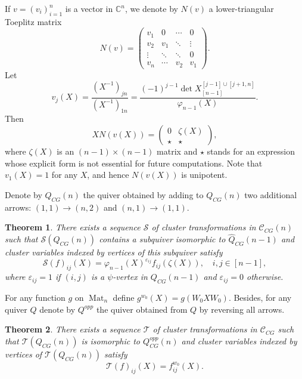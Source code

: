 \documentclass{amsart}
\newtheorem{theorem}{Theorem}
\theoremstyle{definition}
\theoremstyle{remark}
\numberwithin{equation}{section}
\numberwithin{theorem}{section}
\begin{document}
If $v=(v_i)_{i=1}^n$ is a vector in $\mathbb{C}^n$, we denote by $N(v)$ a
lower-triangular Toeplitz matrix
 $$
 N(v) = \left (
 \begin{matrix}
 v_1 & 0 & \cdots & 0\\
 v_2 & v_1 & \ddots  & \vdots\\
 \vdots & \ddots & \ddots  & 0\\
 v_n  & \cdots & v_2 & v_1
 \end{matrix}
 \right ).
 $$
Let 
\begin{equation}
\label{v_j}
v_j(X) = \frac{\left ( X^{-1}\right)_{jn}}{\left ( X^{-1}\right)_{1n}}
=\frac{(-1)^{j-1}\det X_{[n-1]}^{[j-1]\cup[j+1,n]}}{{{\varphi}}_{n-1}(X)}.
\end{equation}
Then
\begin{equation}
\label{zeta}
 X N(v(X)) = \left (
 \begin{array}{cc}
 0 & \zeta(X)\\
 \star & \star
 \end{array}
 \right ),
\end{equation}
 where $\zeta(X)$ is an $(n-1)\times (n-1)$ matrix and $\star$ stands for an expression whose explicit form is not essential for future
computations. Note that $v_1(X)=1$ for any $X$, and hence
$N(v(X))$ is unipotent. 

Denote by $\hat Q_{CG}(n)$ the quiver obtained by adding to $Q_{CG}(n)$ two
additional arrows: $(1,1) \to (n,2)$ and $(n,1)\to (1,1)$.

 \begin{theorem}
 \label{transform1}
  There exists a sequence $\mathcal S$ of cluster transformations in ${{\mathcal C}}_{CG}(n)$
such that $\mathcal S(Q_{CG}(n))$ contains
  a subquiver isomorphic to $\hat Q_{CG}(n-1)$ and cluster variables indexed by
vertices of this subquiver satisfy
  $$\mathcal S(f)_{ij}(X)=
  {{\varphi}}_{n-1}(X)^{\varepsilon_{ij}}
  f_{ij}(\zeta(X)),\quad i,j\in [n-1],
  $$
  where $\varepsilon_{ij}=1$ if $(i,j)$ is a ${{\psi}}$-vertex in $Q_{CG}(n-1)$
and $\varepsilon_{ij}=0$ otherwise.
 \end{theorem}
 
For any function $g$ on ${\operatorname{Mat}}_n$ define $g^{w_0}(X)=g(W_0XW_0)$.
 Besides, for any quiver $Q$ denote by $Q^{opp}$ the quiver obtained from $Q$ by reversing all
arrows. 

  \begin{theorem}
 \label{transform2}
 There exists a sequence $\mathcal T$ of cluster transformations in ${{\mathcal C}}_{CG}$ such
that $\mathcal T(Q_{CG}(n))$ is isomorphic
 to $Q_{CG}^{opp}(n)$ and cluster variables indexed by vertices of
 $\mathcal T(Q_{CG}(n))$ satisfy
 $$\mathcal T(f)_{ij}(X) = f^{w_0}_{ij}(X).$$
 \end{theorem}
\end{document}
